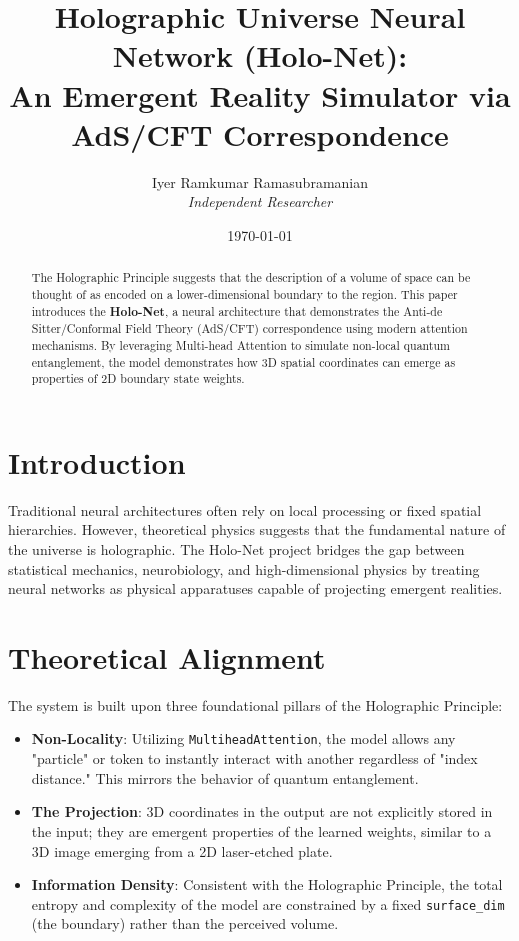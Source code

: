 \documentclass[12pt]{article}
\title{\textbf{Holographic Universe Neural Network (Holo-Net): \\ An Emergent Reality Simulator via AdS/CFT Correspondence}}
\author{Iyer Ramkumar Ramasubramanian \\ \textit{Independent Researcher}}
\date{\today}
\begin{document}
\maketitle

\begin{abstract}
The Holographic Principle suggests that the description of a volume of space can be thought of as encoded on a lower-dimensional boundary to the region. This paper introduces the \textbf{Holo-Net}, a neural architecture that demonstrates the Anti-de Sitter/Conformal Field Theory (AdS/CFT) correspondence using modern attention mechanisms. By leveraging Multi-head Attention to simulate non-local quantum entanglement, the model demonstrates how 3D spatial coordinates can emerge as properties of 2D boundary state weights. 
\end{abstract}

\section{Introduction}
Traditional neural architectures often rely on local processing or fixed spatial hierarchies. However, theoretical physics suggests that the fundamental nature of the universe is holographic. The Holo-Net project bridges the gap between statistical mechanics, neurobiology, and high-dimensional physics by treating neural networks as physical apparatuses capable of projecting emergent realities.

\section{Theoretical Alignment}

The system is built upon three foundational pillars of the Holographic Principle:

\begin{itemize}
\item \textbf{Non-Locality}: Utilizing \texttt{MultiheadAttention}, the model allows any "particle" or token to instantly interact with another regardless of "index distance." This mirrors the behavior of quantum entanglement.
\item \textbf{The Projection}: 3D coordinates in the output are not explicitly stored in the input; they are emergent properties of the learned weights, similar to a 3D image emerging from a 2D laser-etched plate.
\item \textbf{Information Density}: Consistent with the Holographic Principle, the total entropy and complexity of the model are constrained by a fixed \texttt{surface\_dim} (the boundary) rather than the perceived volume.
\end{itemize}
\end{document}
